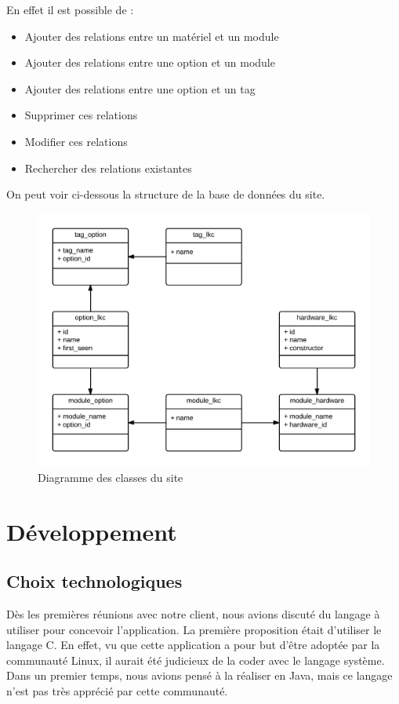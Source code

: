 ﻿\documentclass[17pts]{report}
\begin{document}
En effet il est possible de : \\


\begin{itemize}
    \item Ajouter des relations entre un matériel et un module
    \item Ajouter des relations entre une option et un module
    \item Ajouter des relations entre une option et un tag
    \item Supprimer ces relations
    \item Modifier ces relations
    \item Rechercher des relations existantes
\end{itemize}

On peut voir ci-dessous la structure de la base de données du site. \\

\begin{figure}[H]
    \includegraphics[scale=0.2]{./illustrations/diagramme_classes_site.png}
    \centering
    \caption{Diagramme des classes du site}
    \label{fig:DiagSite}
\end{figure}


\chapter{Développement}\thispagestyle{IHA-fancy-style}
\label{cha:Développement}
\section{Choix technologiques}
\label{sec:Choix technologiques}
Dès les premières réunions avec notre client, nous avions discuté du langage à
utiliser pour concevoir l'application. La première proposition était d'utiliser
le langage C. En effet, vu que cette application a pour but d'être adoptée par
la communauté Linux, il aurait été judicieux de la coder avec le langage
système. Dans un premier temps, nous avions pensé à la réaliser en Java, mais
ce langage n'est pas très apprécié par cette communauté.  \\
\end{document}
